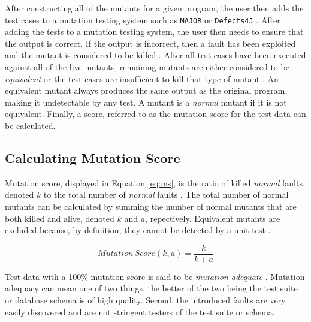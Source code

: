\documentclass[conference]{IEEEtran}
\begin{document}
After constructing all of the mutants for a given program, the user then adds the test cases
to a mutation testing system such as \texttt{MAJOR} \cite{just2011major} or
\texttt{Defects4J} \cite{just2014defects4j}. After adding the tests to a mutation testing system,
the user then needs to ensure that the output is correct. If the output is incorrect, then
a fault has been exploited and the mutant is considered to be killed \cite{offutt1993experimental}.
After all test cases have been executed against all of the live mutants, remaining mutants are either
considered to be \textit{equivalent} or the test cases are insufficient to kill that type of mutant \cite{gopinath2015empirical}. An equivalent
mutant always produces the same output as the original program, making it undetectable by any test. A mutant
is a \textit{normal} mutant if it is not equivalent.
Finally, a score, referred to as the mutation score for the test data can be calculated.

\subsection{Calculating Mutation Score}
Mutation score, displayed in Equation \ref{eq:ms}, is the ratio of killed \textit{normal} faults, denoted $k$ to the total number of \textit{normal} faults \cite{wright2013efficient}.
The total number of normal mutants can be calculated by summing the number of normal mutants that are both killed and alive, denoted $k$ and $a$, repectively.
Equivalent mutants are excluded because, by definition, they cannot be detected by a unit test \cite{inozemtseva2014coverage}.

\begin{equation}
    Mutation \, Score(k,a) = \frac{k}{k+a}
    \label{eq:ms}
\end{equation}

Test data with a 100\% mutation score is said to be \textit{mutation adequate} \cite{offutt1993experimental}.
Mutation adequacy can mean one of two things, the better of the two being the test suite
or database schema is of high quality. Second, the introduced faults are very easily
discovered and are not stringent testers of the test suite or schema.
\end{document}
